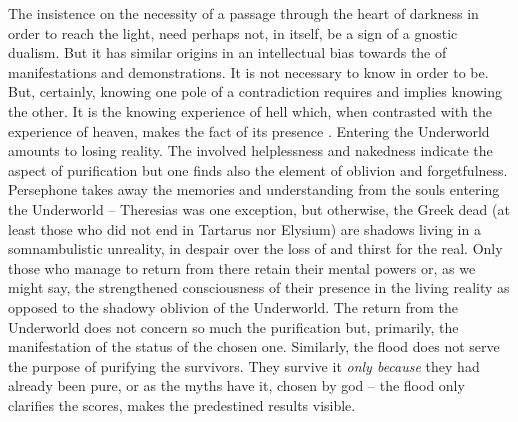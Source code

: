 The insistence on the necessity of a passage through the heart of darkness in
order to reach the light, need perhaps not, in itself, be a sign of a gnostic
dualism. But it has similar origins in an intellectual bias towards the
 of  manifestations and demonstrations.  It is not
necessary to know in order to be. But, certainly,  knowing one pole
of a contradiction requires and implies knowing the other.  It is the knowing
experience of hell which, when contrasted with the experience of heaven, makes
the fact of its presence . Entering the Underworld amounts to losing reality. The involved
helplessness and nakedness indicate the aspect of purification but one finds
also the element of oblivion and forgetfulness.  Persephone takes away the
memories and understanding from the souls entering the Underworld -- Theresias
was one exception, but otherwise, the Greek dead (at least those who did not end
in Tartarus nor Elysium) are shadows living in a somnambulistic unreality, in
despair over the loss of and thirst for the real.  Only those who manage to
return from there retain their mental powers or, as we might say, the
strengthened consciousness of their presence in the living reality as opposed to
the shadowy 
oblivion of the Underworld. The return from the Underworld does not concern so
much the purification but, primarily, the manifestation of the status of the
chosen one.  Similarly, the flood does not serve the purpose of purifying the
survivors.  They survive it {\em only because} they had already been pure, or as
the myths have it, chosen by god -- the flood only clarifies the scores, makes
the predestined results visible.

